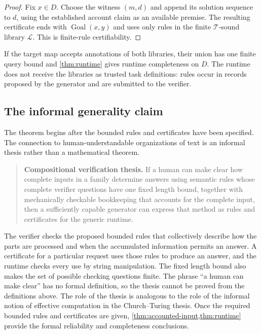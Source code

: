 \documentclass[11pt,twoside]{article}
\theoremstyle{definition}
\newcommand{\True}{\mathcal T}
\newcommand{\Lib}{\mathcal L}
\newcommand{\Goal}{\operatorname{Goal}}
\begin{document}
\begin{proof}
Fix $x\in D$. Choose the witness $(m,d)$ and append its solution sequence to
$d$, using the established account claim as an available premise. The
resulting certificate ends with $\Goal(x,y)$ and uses only rules in the finite
$\True$-sound library $\Lib$. This is finite-rule certifiability.
\end{proof}

If the target map accepts annotations of both libraries, their union has one
finite query bound and \cref{thm:runtime} gives runtime completeness on $D$.
The runtime does not receive the libraries as trusted task definitions: rules
occur in records proposed by the generator and are submitted to the verifier.

\subsection{The informal generality claim}

The theorem begins after the bounded rules and certificates have been
specified. The connection to human-understandable organizations of text is an
informal thesis rather than a mathematical theorem.

\begin{quote}
\textbf{Compositional verification thesis.}
If a human can make clear how complete inputs in a family determine answers
using semantic rules whose complete verifier questions have one fixed length
bound, together with mechanically checkable bookkeeping that accounts for the
complete input, then a sufficiently capable generator can express that method
as rules and certificates for the generic runtime.
\end{quote}

The verifier checks the proposed bounded rules that collectively describe how
the parts are processed and when the accumulated information permits an
answer. A certificate for a particular request uses those rules to produce an
answer, and the runtime checks every use by string manipulation. The fixed
length bound also makes the set of possible checking questions finite. The phrase
``a human can make clear'' has no formal definition, so the thesis cannot be
proved from the definitions above. The role of the thesis is analogous to the
role of the informal notion of effective computation in the Church--Turing
thesis. Once the required bounded rules and certificates are given,
\cref{thm:accounted-input,thm:runtime} provide the formal reliability and
completeness conclusions.
\end{document}
